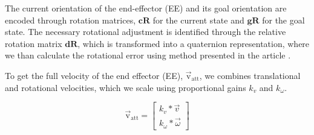 \documentclass[letterpaper, 10 pt, conference]{ieeeconf}  %
\begin{document}
The current orientation of the end-effector (EE) and its goal orientation are encoded through rotation matrices, \(\mathbf{cR}\) for the current state and \(\mathbf{gR}\) for the goal state. The necessary rotational adjustment is identified through the relative rotation matrix \(\mathbf{dR}\), which is transformed into a quaternion representation, where we than calculate the rotational error using method presented in the article \cite{Zlajpah2017}. 
%
%
%
%
%
%
%
%
%

To get the full velocity of the end effector (EE), \( \mathrm{\vec{v}_{att}} \), we combines translational and rotational velocities, which we scale using proportional gains \( k_v \) and \( k_\omega \).

\begin{equation}
	\mathrm{\vec{v}_{att}} = 
	\begin{bmatrix}
		k_{v} * \vec{v}   \\
		k_{\omega} * \vec{\omega}
	\end{bmatrix}
	\label{eq:ee_velocity}
\end{equation}
\end{document}

